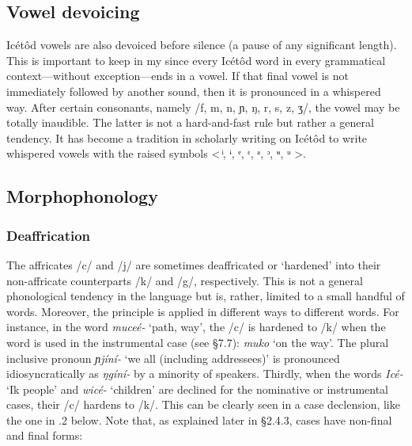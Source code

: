 \subsection{Vowel devoicing}


Icétôd vowels are also devoiced before silence (a pause of any significant length). This is important to keep in my since every Icétôd word in every grammatical context—without exception—ends in a vowel. If that final vowel is not immediately followed by another sound, then it is pronounced in a whispered way. After certain consonants, namely /f, m, n, ɲ, ŋ, r, s, z, ʒ/, the vowel may be totally inaudible. The latter is not a hard-and-fast rule but rather a general tendency. It has become a tradition in scholarly writing on Icétôd to write whispered vowels with the raised symbols < ͥ, ᶤ, ᵉ, ᵋ, ᵃ, ᵓ, ᶶ, ᵘ >.
 
\subsection{Morphophonology}
\subsubsection{Deaffrication}

The affricates\textsc{} /c/ and /j/ are sometimes deaffricated or ‘hardened’ into their non-affricate counterparts /k/ and /g/, respectively. This is not a general phonological tendency in the language but is, rather, limited to a small handful of words. Moreover, the principle is applied in different ways to different words. For instance, in the word \textit{muceé-} ‘path, way’, the /c/ is hardened to /k/ when the word is used in the instrumental case (see §7.7): \textit{muko} ‘on the way’. The plural inclusive pronoun \textit{ɲjíní-} ‘we all (including addressees)’ is pronounced idiosyncratically as \textit{ŋgíní-} by a minority of speakers. Thirdly, when the words \textit{Icé-} ‘Ik people’ and \textit{wicé-} ‘children’ are declined for the nominative or instrumental cases, their /c/ hardens to /k/. This can be clearly seen in a case declension, like the one in .2 below. Note that, as explained later in §2.4.3, cases have non-final and final forms:


